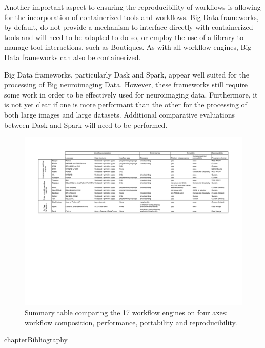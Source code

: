 \documentclass{report}
\begin{document}
        Another important aspect to ensuring the reproducibility of workflows
        is allowing for the incorporation of containerized tools and workflows.
        Big Data frameworks, by default, do not provide a mechanism to interface
        directly with containerized tools and will need to be adapted to do so,
        or employ the use of a library to manage tool interactions, such as 
        Boutiques. As with all workflow engines, Big Data frameworks can also 
        be containerized.

        Big Data frameworks, particularly Dask and Spark, appear well suited for
        the processing of Big neuroimaging Data. However, these frameworks still
        require some work in order to be effectively used for neuroimaging data.
        Furthermore, it is not yet clear if one is more performant than the other
        for the processing of both large images and large datasets. Additional
        comparative evaluations between Dask and Spark will need to be performed.

    \begin{figure}
        \centering
        \includegraphics[width=\textwidth,height=\textheight,keepaspectratio]{Figures/summary.pdf}
        \caption{Summary table comparing the 17 workflow engines on four axes:
        workflow composition, performance, portability and reproducibility.}
    \end{figure} 
        {chapter}{Bibliography} 
        
        
\end{document}
